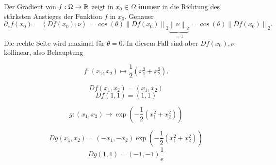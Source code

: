 \begin{note}
	Der Gradient von $ f : \Omega \to \mathbb{R}  $ zeigt in $ x_0 \in \Omega $ \textbf{immer} in die Richtung des stärksten Anstieges der Funktion $ f $ in $ x_0 $.
	Genauer
	\[
		\partial_\nu f(x_0) = \left< D f(x_0), \nu \right> = \cos \left( \theta \right) \left\| D f(x_0) \right\| _2 \underbrace{\left\| \nu \right\| _2}_{= 1} = \cos (\theta) \left\| D f(x_0) \right\| _2.
	\]
	Die rechte Seite wird maximal für $ \theta = 0 $.
	In diesem Fall sind aber $ Df(x_0), \nu $ kollinear, also Behauptung
\end{note}

\begin{example}
	\[
		f : (x_1, x_2) \mapsto \frac{ 1 }{ 2 } \left( x_1^2 + x_2^2 \right) .
	\]
	\[
		Df(x_1, x_2) = (x_1, x_2)
	\]
	\[
		Df(1, 1) = (1, 1)
	\]
\end{example}

\begin{example}
	\[
		g : (x_1, x_2) \mapsto \exp \left( -\frac{ 1 }{ 2 } \left( x_1^2 + x_2^2 \right)  \right) 
	\]
	\[
		Dg(x_1, x_2) = (-x_1, -x_2) \exp \left( -\frac{ 1 }{ 2 } \left( x_1^2 + x_2^2 \right)  \right) 
	\]
	\[
		Dg(1, 1) = (-1, -1) \frac{ 1 }{ e } 
	\]
	
\end{example}

